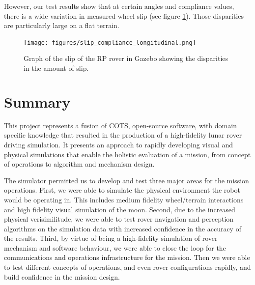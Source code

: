 \documentclass[twocolumn,letterpaper]{IEEEAerospaceCLS}  %
\begin{document}
However, our test results show that at certain angles and compliance values, there is a wide variation in measured wheel slip (see figure \ref{fig:slipdisparities}). Those disparities are particularly large on a flat terrain.
\begin{figure}[h!]
	\texttt{[image: figures/slip\_compliance\_longitudinal.png]}
   	\caption{Graph of the slip of the RP rover in Gazebo showing the disparities in the amount of slip.}
    \label{fig:slipdisparities}
\end{figure}

\section{Summary}

This project represents a fusion of COTS, open-source software, with domain specific knowledge that resulted in the production of a high-fidelity lunar rover driving simulation. It presents an approach to rapidly developing visual and physical simulations that enable the holistic evaluation of a mission, from concept of operations to algorithm and mechanism design.

The simulator permitted us to develop and test three major areas for the mission operations.  First, we were able to simulate the physical environment the robot would be operating in.  This includes medium fidelity wheel/terrain interactions and high fidelity visual simulation of the moon.  Second, due to the increased physical verisimilitude, we were able to test rover navigation and perception algorithms on the simulation data with increased confidence in the accuracy of the results.  Third, by virtue of being a high-fidelity simulation of rover mechanism and software behaviour, we were able to close the loop for the communications and operations infrastructure for the mission.  Then we were able to test different concepts of operations, and even rover configurations rapidly, and build confidence in the mission design.




\end{document}
